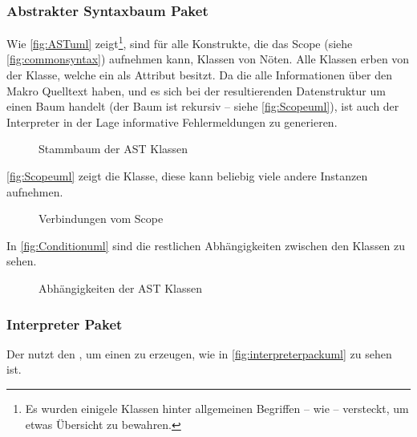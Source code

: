 {    \subsubsection{Abstrakter Syntaxbaum Paket}
    \label{sssec:Abstrakter Syntaxbaum Paket}
      Wie \autoref{fig:ASTuml} zeigt\footnote{
        Es wurden einigele Klassen hinter allgemeinen Begriffen -- wie  -- versteckt, um etwas Übersicht zu bewahren.
      }, sind für alle Konstrukte, die das Scope (siehe \autoref{fig:commonsyntax}) aufnehmen kann, Klassen von Nöten. Alle Klassen erben von der  Klasse, welche ein  als Attribut besitzt. Da die  alle Informationen über den Makro Quelltext haben, und es sich bei der resultierenden Datenstruktur um einen Baum handelt (der Baum ist rekursiv -- siehe \autoref{fig:Scopeuml}), ist auch der Interpreter in der Lage informative Fehlermeldungen zu generieren.
      \begin{figure}[H]
        \centering
        \caption{Stammbaum der AST Klassen}
        \label{fig:ASTuml}
      \end{figure}

      \autoref{fig:Scopeuml} zeigt die  Klasse, diese kann beliebig viele andere  Instanzen aufnehmen.
      \begin{figure}[H]
        \centering
        \caption{Verbindungen vom Scope}
        \label{fig:Scopeuml}
      \end{figure}

      In \autoref{fig:Conditionuml} sind die restlichen Abhängigkeiten zwischen den  Klassen zu sehen.
      \begin{figure}[H]
        \centering
        \caption{Abhängigkeiten der AST Klassen}
        \label{fig:Conditionuml}
      \end{figure}

    \subsubsection{Interpreter Paket}
    \label{sssec:Interpreter Paket}
      Der  nutzt den , um einen  zu erzeugen, wie in \autoref{fig:interpreterpackuml} zu sehen ist.

}
